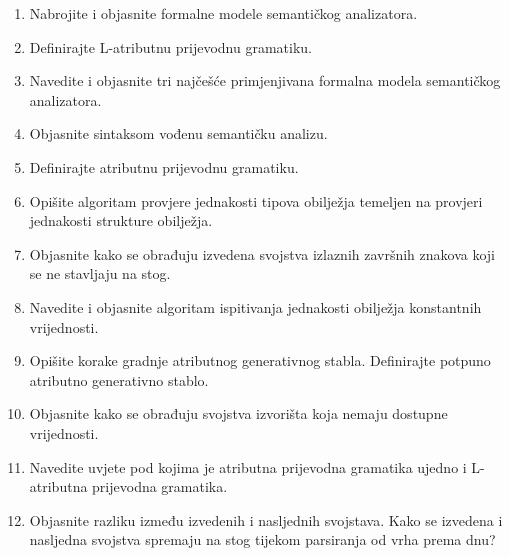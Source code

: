 \documentclass[times, 12pt, utf8]{book}
\begin{document}
\begin{enumerate}[resume]
\item
Nabrojite i objasnite formalne modele semantičkog analizatora. \cite[str.~169-170]{udzbenik}

\item
Definirajte L-atributnu prijevodnu gramatiku. \cite[str.~180-181]{udzbenik}

\item
Navedite i objasnite tri najčešće primjenjivana formalna modela semantičkog analizatora. \cite[str.~169-170]{udzbenik}

\item
Objasnite sintaksom vođenu semantičku analizu. \cite[str.~170-171]{udzbenik}

\item
Definirajte atributnu prijevodnu gramatiku. \cite[str.~173]{udzbenik}

\item
Opišite algoritam provjere jednakosti tipova obilježja temeljen na provjeri jednakosti strukture obilježja. \cite[str.~204-208]{udzbenik}

\item
Objasnite kako se obrađuju izvedena svojstva izlaznih završnih znakova koji se ne stavljaju na stog. \cite[str.~173-176]{udzbenik}

\item
Navedite i objasnite algoritam ispitivanja jednakosti obilježja konstantnih vrijednosti. \cite[str.~203-204]{udzbenik}

\item
Opišite korake gradnje atributnog generativnog stabla.
Definirajte potpuno atributno generativno stablo. \cite[str.~178]{udzbenik}

\item
Objasnite kako se obrađuju svojstva izvorišta koja nemaju dostupne vrijednosti. \cite[str.~194]{udzbenik}

\item
Navedite uvjete pod kojima je atributna prijevodna gramatika ujedno i L-atributna prijevodna gramatika. \cite[str.~180-181]{udzbenik}

\item
Objasnite razliku između izvedenih i nasljednih svojstava.
Kako se izvedena i nasljedna svojstva spremaju na stog tijekom parsiranja od vrha prema dnu? \cite[str.~173-177]{udzbenik}


\end{enumerate}
\end{document}
